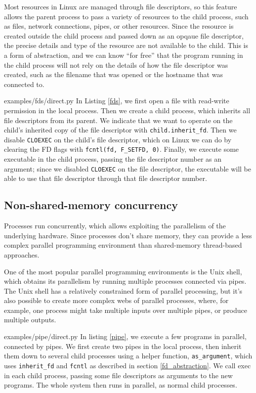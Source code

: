 \documentclass[letterpaper,twocolumn,10pt]{article}
\begin{document}
Most resources in Linux are managed through file descriptors,
so this feature allows the parent process to pass a variety of resources to the child process,
such as files, network connections, pipes, or other resources.\cite{ucspi}
Since the resource is created outside the child process and passed down as an opqaue file descriptor,
the precise details and type of the resource are not available to the child.
This is a form of abstraction,
and we can know ``for free''\cite{theoremsforfree}
that the program running in the child process
will not rely on the details of how the file descriptor was created,
such as the filename that was opened or the hostname that was connected to.


{examples/fds/direct.py}
In Listing \ref{fds},
we first open a file with read-write permission in the local process.
Then we create a child process,
which inherits all file descriptors from its parent.
We indicate that we want to operate on the child's inherited copy of the file descriptor with \verb|child.inherit_fd|.
Then we disable \texttt{CLOEXEC} on the child's file descriptor,
which on Linux we can do by clearing the FD flags with \verb|fcntl(fd, F_SETFD, 0)|.
Finally, we execute some executable in the child process,
passing the file descriptor number as an argument;
since we disabled \texttt{CLOEXEC} on the file descriptor,
the executable will be able to use that file descriptor through that file descriptor number.
\subsection{Non-shared-memory concurrency}
Processes run concurrently,
which allows exploiting the parallelism of the underlying hardware.
Since processes don't share memory,
they can provide a less complex parallel programming environment
than shared-memory thread-based approaches.

One of the most popular parallel programming environments is the Unix shell,
which obtains its parallelism by running multiple processes connected via pipes.
The Unix shell has a relatively constrained form of parallel processing,
but it's also possible to create more complex webs of parallel processes,
where, for example, one process might take multiple inputs over multiple pipes,
or produce multiple outputs.


{examples/pipe/direct.py}
In listing \ref{pipe},
we execute a few programs in parallel,
connected by pipes.
We first create two pipes in the local process,
then inherit them down to several child processes using a helper function, \verb|as_argument|,
which uses \verb|inherit_fd| and \texttt{fcntl} as described in section \ref{fd_abstraction}.
We call exec in each child process, passing some file descriptors as arguments to the new programs.
The whole system then runs in parallel,
as normal child processes.
\end{document}
